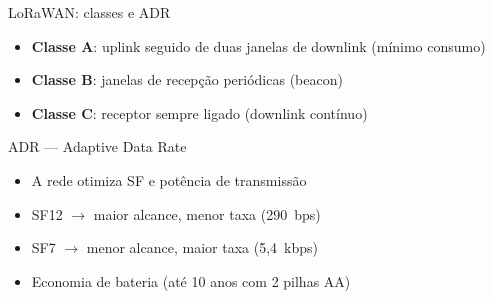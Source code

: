 \documentclass[aspectratio=169,11pt]{beamer}
\begin{document}
\begin{frame}{LoRaWAN: classes e ADR}
  \begin{itemize}
    \item \textbf{Classe A}: uplink seguido de duas janelas de downlink (mínimo consumo)
    \item \textbf{Classe B}: janelas de recepção periódicas (beacon)
    \item \textbf{Classe C}: receptor sempre ligado (downlink contínuo)
  \end{itemize}
  \begin{block}{ADR --- Adaptive Data Rate}
    \begin{itemize}
      \item A rede otimiza SF e potência de transmissão
      \item SF12 $\rightarrow$ maior alcance, menor taxa (290~bps)
      \item SF7 $\rightarrow$ menor alcance, maior taxa (5,4~kbps)
      \item Economia de bateria (até 10 anos com 2 pilhas AA)
    \end{itemize}
  \end{block}
\end{frame}
\end{document}
